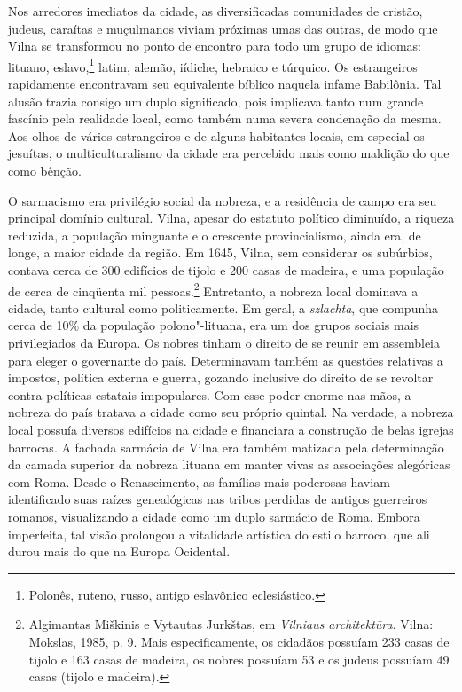 Nos arredores imediatos da cidade, as diversificadas comunidades de
cristão, judeus, caraítas e muçulmanos viviam próximas umas das outras,
de modo que Vilna se transformou no ponto de encontro para todo um grupo
de idiomas: lituano, eslavo,\footnote{Polonês, ruteno, russo, antigo eslavônico
eclesiástico.} latim, alemão, iídiche, hebraico e túrquico. Os
estrangeiros rapidamente encontravam seu equivalente bíblico naquela
infame Babilônia. Tal alusão trazia consigo um duplo significado, pois
implicava tanto num grande fascínio pela realidade local, como também
numa severa condenação da mesma. Aos olhos de vários estrangeiros e de
alguns habitantes locais, em especial os jesuítas, o multiculturalismo
da cidade era percebido mais como maldição do que como bênção.

O sarmacismo era privilégio social da nobreza, e a residência de campo
era seu principal domínio cultural. Vilna, apesar do estatuto político
diminuído, a riqueza reduzida, a população minguante e o crescente
provincialismo, ainda era, de longe, a maior cidade da região. Em 1645,
Vilna, sem considerar os subúrbios, contava cerca de 300 edifícios de
tijolo e 200 casas de madeira, e uma população de cerca de cinqüenta mil
pessoas.\footnote{Algimantas Miškinis e Vytautas Jurkštas, em \textit{Vilniaus architektūra}. Vilna: Mokslas, 1985, p. 9. Mais especificamente, os cidadãos possuíam 233 casas de tijolo e 163 casas de madeira, os nobres possuíam 53 e os judeus possuíam 49 casas (tijolo e madeira).} Entretanto, a nobreza local dominava a cidade, tanto cultural como politicamente. Em geral, a \textit{szlachta}, que
compunha cerca de 10\% da população polono"-lituana, era um dos
grupos sociais mais privilegiados da Europa. Os nobres tinham o direito
de se reunir em assembleia para eleger o governante do país.
Determinavam também as questões relativas a impostos, política externa e
guerra, gozando inclusive do direito de se revoltar contra políticas
estatais impopulares. Com esse poder enorme nas mãos, a nobreza do país
tratava a cidade como seu próprio quintal. Na verdade, a nobreza local
possuía diversos edifícios na cidade e financiara a construção de belas
igrejas barrocas. A fachada sarmácia de Vilna era também matizada pela
determinação da camada superior da nobreza lituana em manter vivas as
associações alegóricas com Roma. Desde o Renascimento, as famílias mais
poderosas haviam identificado suas raízes genealógicas nas tribos
perdidas de antigos guerreiros romanos, visualizando a cidade como um
duplo sarmácio de Roma. Embora imperfeita, tal visão prolongou a
vitalidade artística do estilo barroco, que ali durou mais do que na
Europa Ocidental.

